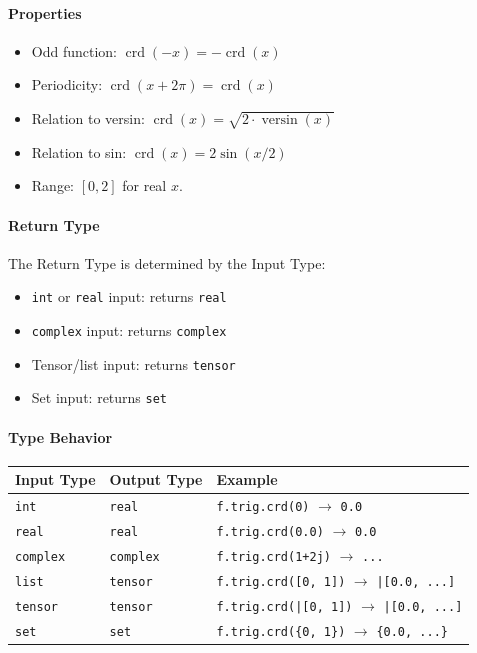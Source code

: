 \paragraph{Properties}
\begin{itemize}
\item Odd function: $\operatorname{crd}(-x) = -\operatorname{crd}(x)$
\item Periodicity: $\operatorname{crd}(x + 2\pi) = \operatorname{crd}(x)$
\item Relation to versin: $\operatorname{crd}(x) = \sqrt{2 \cdot \operatorname{versin}(x)}$
\item Relation to sin: $\operatorname{crd}(x) = 2\sin(x/2)$
\item Range: $[0, 2]$ for real $x$.
\end{itemize}

\paragraph{Return Type}
The Return Type is determined by the Input Type:
\begin{itemize}
\item \texttt{int} or \texttt{real} input: returns \texttt{real}
\item \texttt{complex} input: returns \texttt{complex}
\item Tensor/list input: returns \texttt{tensor}
\item Set input: returns \texttt{set}
\end{itemize}

\paragraph{Type Behavior}
\begin{center}
\begin{tabular}{lll}
\textbf{Input Type} & \textbf{Output Type} & \textbf{Example} \\ \hline
\texttt{int} & \texttt{real} & \texttt{f.trig.crd(0)} $\to$ \texttt{0.0} \\
\texttt{real} & \texttt{real} & \texttt{f.trig.crd(0.0)} $\to$ \texttt{0.0} \\
\texttt{complex} & \texttt{complex} & \texttt{f.trig.crd(1+2j)} $\to$ \texttt{...} \\
\texttt{list} & \texttt{tensor} & \texttt{f.trig.crd([0, 1])} $\to$ \texttt{|[0.0, ...]} \\
\texttt{tensor} & \texttt{tensor} & \texttt{f.trig.crd(|[0, 1])} $\to$ \texttt{|[0.0, ...]} \\
\texttt{set} & \texttt{set} & \texttt{f.trig.crd(\{0, 1\})} $\to$ \texttt{\{0.0, ...\}} \\
\end{tabular}
\end{center}

